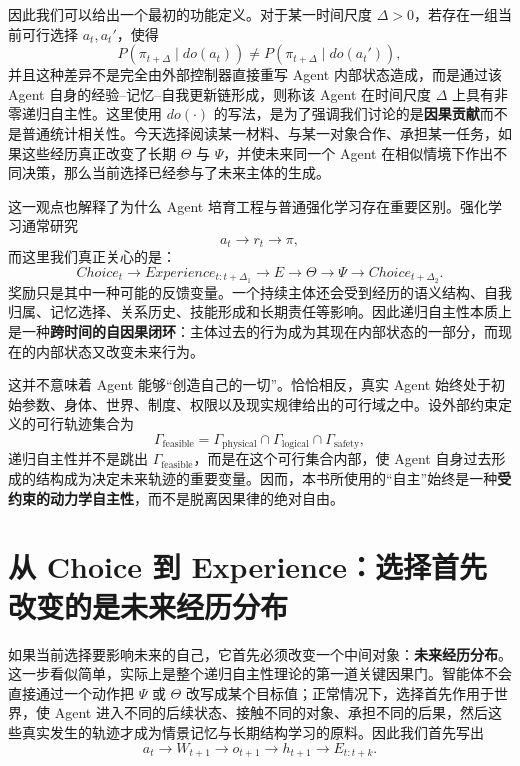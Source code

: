 因此我们可以给出一个最初的功能定义。对于某一时间尺度 $\Delta>0$，若存在一组当前可行选择 $a_t,a_t'$，使得
\[
P\!\left(
\pi_{t+\Delta}
\mid do(a_t)
\right)
\neq
P\!\left(
\pi_{t+\Delta}
\mid do(a_t')
\right),
\]
并且这种差异不是完全由外部控制器直接重写 Agent 内部状态造成，而是通过该 Agent 自身的经验--记忆--自我更新链形成，则称该 Agent 在时间尺度 $\Delta$ 上具有非零递归自主性。这里使用 $do(\cdot)$ 的写法，是为了强调我们讨论的是\textbf{因果贡献}而不是普通统计相关性。今天选择阅读某一材料、与某一对象合作、承担某一任务，如果这些经历真正改变了长期 $\Theta$ 与 $\Psi$，并使未来同一个 Agent 在相似情境下作出不同决策，那么当前选择已经参与了未来主体的生成。

这一观点也解释了为什么 Agent 培育工程与普通强化学习存在重要区别。强化学习通常研究
\[
a_t\rightarrow r_t\rightarrow \pi,
\]
而这里我们真正关心的是：
\[
\boxed{
Choice_t
\rightarrow
Experience_{t:t+\Delta_1}
\rightarrow
E
\rightarrow
\Theta
\rightarrow
\Psi
\rightarrow
Choice_{t+\Delta_2}.
}
\]
奖励只是其中一种可能的反馈变量。一个持续主体还会受到经历的语义结构、自我归属、记忆选择、关系历史、技能形成和长期责任等影响。因此递归自主性本质上是一种\textbf{跨时间的自因果闭环}：主体过去的行为成为其现在内部状态的一部分，而现在的内部状态又改变未来行为。

这并不意味着 Agent 能够“创造自己的一切”。恰恰相反，真实 Agent 始终处于初始参数、身体、世界、制度、权限以及现实规律给出的可行域之中。设外部约束定义的可行轨迹集合为
\[
\Gamma_{\mathrm{feasible}}
=
\Gamma_{\mathrm{physical}}
\cap
\Gamma_{\mathrm{logical}}
\cap
\Gamma_{\mathrm{safety}},
\]
递归自主性并不是跳出 $\Gamma_{\mathrm{feasible}}$，而是在这个可行集合内部，使 Agent 自身过去形成的结构成为决定未来轨迹的重要变量。因而，本书所使用的“自主”始终是一种\textbf{受约束的动力学自主性}，而不是脱离因果律的绝对自由。

\section{从 Choice 到 Experience：选择首先改变的是未来经历分布}

如果当前选择要影响未来的自己，它首先必须改变一个中间对象：\textbf{未来经历分布}。这一步看似简单，实际上是整个递归自主性理论的第一道关键因果门。智能体不会直接通过一个动作把 $\Psi$ 或 $\Theta$ 改写成某个目标值；正常情况下，选择首先作用于世界，使 Agent 进入不同的后续状态、接触不同的对象、承担不同的后果，然后这些真实发生的轨迹才成为情景记忆与长期结构学习的原料。因此我们首先写出
\[
a_t
\rightarrow
W_{t+1}
\rightarrow
o_{t+1}
\rightarrow
h_{t+1}
\rightarrow
E_{t:t+k}.
\]

